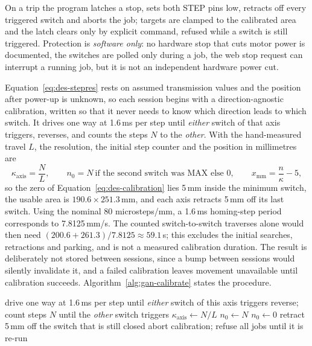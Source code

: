 On a trip the program latches a stop, sets both STEP pins low, retracts off every triggered switch and aborts the job; targets are clamped to the calibrated area and the latch clears only by explicit command, refused while a switch is still triggered. Protection is \emph{software only}: no hardware stop that cuts motor power is documented, the switches are polled only during a job, the web stop request can interrupt a running job, but it is not an independent hardware power cut.

\label{sec:gan-calib}
Equation~\ref{eq:des-stepres} rests on assumed transmission values and the position after power-up is unknown, so each session begins with a direction-agnostic calibration, written so that it never needs to know which direction leads to which switch. It drives one way at 1.6\,ms per step until \emph{either} switch of that axis triggers, reverses, and counts the steps $N$ to the \emph{other}. With the hand-measured travel $L$, the resolution, the initial step counter and the position in millimetres are
\begin{equation}
\kappa_{\mathrm{axis}}=\frac{N}{L},\qquad n_0=N\ \text{if the second switch was MAX else }0,\qquad x_{\mathrm{mm}}=\frac{n}{\kappa}-5,
\label{eq:des-calibration}
\end{equation}
so the zero of Equation~\ref{eq:des-calibration} lies 5\,mm inside the minimum switch, the usable area is $190.6\times251.3$\,mm, and each axis retracts 5\,mm off its last switch. Using the nominal 80 microsteps/mm, a 1.6\,ms homing-step period corresponds to 7.8125\,mm/s. The counted switch-to-switch traverses alone would then need $(200.6+261.3)/7.8125\approx59.1$\,s; this excludes the initial searches, retractions and parking, and is not a measured calibration duration. The result is deliberately not stored between sessions, since a bump between sessions would silently invalidate it, and a failed calibration leaves movement unavailable until calibration succeeds. Algorithm~\ref{alg:gan-calibrate} states the procedure.

\begin{algorithm}[!htbp]
\caption{Direction-agnostic calibration of one axis}
\label{alg:gan-calibrate}
\begin{algorithmic}[1]
\STATE drive one way at 1.6\,ms per step until \emph{either} switch of this axis triggers
\STATE reverse; count steps $N$ until the \emph{other} switch triggers
\STATE $\kappa_{\mathrm{axis}}\leftarrow N/L$ 
    \STATE $n_0\leftarrow N$
\ELSE
    \STATE $n_0\leftarrow0$
\ENDIF
\STATE retract 5\,mm off the switch that is still closed
    \STATE abort calibration; refuse all jobs until it is re-run
\ENDIF
\end{algorithmic}
\end{algorithm}

